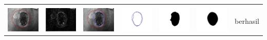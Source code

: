 \begin{table}[H]
\begin{tabular}{|m{0.7in}|m{0.7in}|m{0.7in}|m{0.7in}|m{0.7in}|m{0.7in}|m{0.7in}|}
		&  &  & & & &  \\
		\includegraphics[width=0.7in]{dataset/dataset_3/luka_merah/ready/22_interp_init.jpg}&
		\includegraphics[width=0.7in]{dataset/dataset_3/luka_merah/ready/22_interp_ext.jpg}&
		\includegraphics[width=0.7in]{dataset/dataset_3/luka_merah/ready/22_interp_result.jpg}&
		\includegraphics[width=0.7in]{dataset/dataset_3/luka_merah/ready/22_gt_r.jpg}&
		\includegraphics[width=0.7in]{dataset/dataset_3/luka_merah/ready/22_r.jpg}&
		\includegraphics[width=0.7in]{dataset/dataset_3/luka_merah/ready/22_interp_r.jpg}&
		berhasil\\
		\hline
		

\end{tabular}
\end{table}
